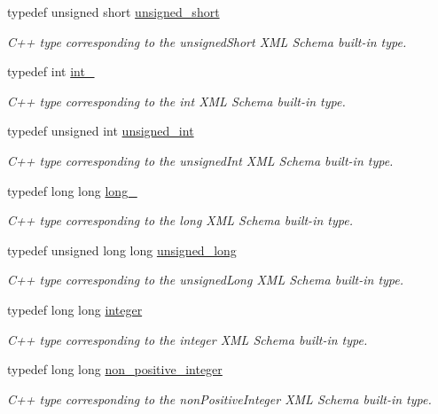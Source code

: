 \begin{DoxyCompactItemize}
typedef unsigned short \hyperlink{namespacexml__schema_a7fc7b4a846c512c370346e15dfdcecaa}{unsigned\-\_\-short}
\begin{DoxyCompactList}\small\item\em C++ type corresponding to the unsigned\-Short X\-M\-L Schema built-\/in type. \end{DoxyCompactList}\item 
typedef int \hyperlink{namespacexml__schema_acfa24ac68e1a188e7f44c36f7a158bf4}{int\-\_\-}
\begin{DoxyCompactList}\small\item\em C++ type corresponding to the int X\-M\-L Schema built-\/in type. \end{DoxyCompactList}\item 
typedef unsigned int \hyperlink{namespacexml__schema_a85ca3205d8af287e149aac54535f57e7}{unsigned\-\_\-int}
\begin{DoxyCompactList}\small\item\em C++ type corresponding to the unsigned\-Int X\-M\-L Schema built-\/in type. \end{DoxyCompactList}\item 
typedef long long \hyperlink{namespacexml__schema_a1d78aacee49e26cb7a69d5aa97df1268}{long\-\_\-}
\begin{DoxyCompactList}\small\item\em C++ type corresponding to the long X\-M\-L Schema built-\/in type. \end{DoxyCompactList}\item 
typedef unsigned long long \hyperlink{namespacexml__schema_a4413fbcf4c65ffc7aaafe465d72fcb33}{unsigned\-\_\-long}
\begin{DoxyCompactList}\small\item\em C++ type corresponding to the unsigned\-Long X\-M\-L Schema built-\/in type. \end{DoxyCompactList}\item 
typedef long long \hyperlink{namespacexml__schema_aaaea7c8ce4dfbe26cc52c91c29c97b7c}{integer}
\begin{DoxyCompactList}\small\item\em C++ type corresponding to the integer X\-M\-L Schema built-\/in type. \end{DoxyCompactList}\item 
typedef long long \hyperlink{namespacexml__schema_a3de6073e510eb8edd71ddc6e0256e2f9}{non\-\_\-positive\-\_\-integer}
\begin{DoxyCompactList}\small\item\em C++ type corresponding to the non\-Positive\-Integer X\-M\-L Schema built-\/in type. \end{DoxyCompactList}\item 

\end{DoxyCompactItemize}
